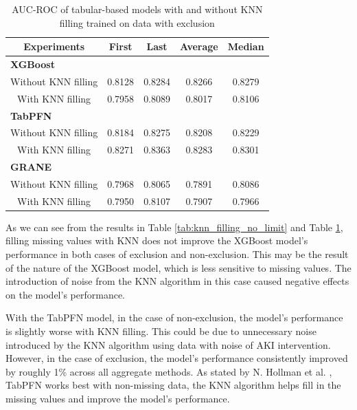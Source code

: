 \documentclass[sn-mathphys-num]{sn-jnl}%
\theoremstyle{thmstyleone}%
\theoremstyle{thmstyletwo}%
\theoremstyle{thmstylethree}%
\begin{document}
\begin{table}[h!]
    \centering
    \caption{AUC-ROC of tabular-based models with and without KNN filling trained on data with exclusion}
    \label{tab:knn_filling_with_limit}

    \begin{tabular}{|c|c|c|c|c|}
        \hline
        \textbf{Experiments} & \textbf{First} & \textbf{Last} & \textbf{Average} & \textbf{Median} \\  \hline        
        \multicolumn{5}{|l|}{\textbf{XGBoost}}  \\ \hline
        Without KNN filling & 0.8128 & 0.8284 & 0.8266 & 0.8279 \\ \hline
        With KNN filling & 0.7958 & 0.8089 & 0.8017 & 0.8106 \\ \hline
        \multicolumn{5}{|l|}{\textbf{TabPFN}}  \\ \hline
        Without KNN filling & 0.8184 & 0.8275 & 0.8208 & 0.8229 \\ \hline
        With KNN filling & 0.8271 & 0.8363 & 0.8283 & 0.8301 \\ \hline
        \multicolumn{5}{|l|}{\textbf{GRANE}}  \\ \hline
        Without KNN filling & 0.7968 & 0.8065 & 0.7891 & 0.8086 \\ \hline
        With KNN filling & 0.7950 & 0.8107 & 0.7907 & 0.7966 \\ \hline
    \end{tabular}
\end{table}

As we can see from the results in Table \ref{tab:knn_filling_no_limit} and Table \ref{tab:knn_filling_with_limit}, filling missing values with KNN does not improve the XGBoost model's performance in both cases of exclusion and non-exclusion.
This may be the result of the nature of the XGBoost model, which is less sensitive to missing values.
The introduction of noise from the KNN algorithm in this case caused negative effects on the model's performance.

With the TabPFN model, in the case of non-exclusion, the model's performance is slightly worse with KNN filling.
This could be due to unnecessary noise introduced by the KNN algorithm using data with noise of AKI intervention.
However, in the case of exclusion, the model's performance consistently improved by roughly 1\% across all aggregate methods.
As stated by N. Hollman et al. \cite{tabpfn}, TabPFN works best with non-missing data, the KNN algorithm helps fill in the missing values and improve the model's performance.
\end{document}
